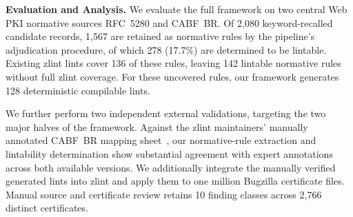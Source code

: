 
\noindent \textbf{Evaluation and Analysis.}
We evaluate the full framework on two central Web PKI normative sources RFC~5280 and CABF~BR.
Of 2,080 keyword-recalled candidate records, 1,567 are retained as normative rules by the pipeline's adjudication procedure, of which 278 (17.7\%) are determined to be lintable.
Existing zlint lints cover 136 of these rules, leaving 142 lintable normative rules without full zlint coverage.
For these uncovered rules, our framework generates 128 deterministic compilable lints.

We further perform two independent external validations, targeting the two major halves of the framework.
Against the zlint maintainers' manually annotated CABF~BR mapping sheet~\cite{zlint-mapping-sheet}, our normative-rule extraction and lintability determination show substantial agreement with expert annotations across both available versions.
We additionally integrate the manually verified generated lints into zlint and apply them to one million Bugzilla certificate files.
Manual source and certificate review retains 10 finding classes across 2,766 distinct certificates.

